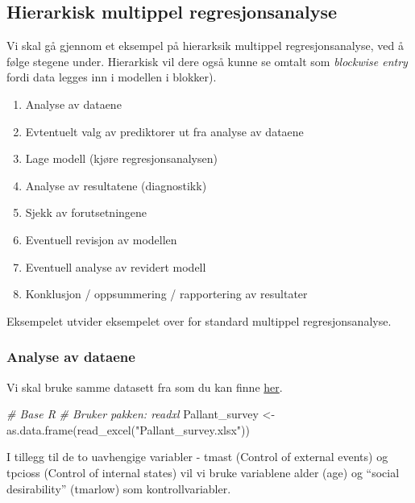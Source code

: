 \documentclass[
]{article}
\newenvironment{Shaded}{\begin{snugshade}}{\end{snugshade}}
\newcommand{\CommentTok}[1]{\textcolor[rgb]{0.56,0.35,0.01}{\textit{#1}}}
\newcommand{\FunctionTok}[1]{\textcolor[rgb]{0.00,0.00,0.00}{#1}}
\newcommand{\NormalTok}[1]{#1}
\newcommand{\OtherTok}[1]{\textcolor[rgb]{0.56,0.35,0.01}{#1}}
\newcommand{\StringTok}[1]{\textcolor[rgb]{0.31,0.60,0.02}{#1}}
\begin{document}
\hypertarget{hierarkisk-multippel-regresjonsanalyse}{%
\subsection{Hierarkisk multippel regresjonsanalyse}\label{hierarkisk-multippel-regresjonsanalyse}}

Vi skal gå gjennom et eksempel på hierarksik multippel regresjonsanalyse, ved å følge stegene under. Hierarkisk vil dere også kunne se omtalt som \emph{blockwise entry} fordi data legges inn i modellen i blokker).

\begin{enumerate}
\def\labelenumi{\arabic{enumi}.}
\item
  Analyse av dataene
\item
  Evtentuelt valg av prediktorer ut fra analyse av dataene
\item
  Lage modell (kjøre regresjonsanalysen)
\item
  Analyse av resultatene (diagnostikk)
\item
  Sjekk av forutsetningene
\item
  Eventuell revisjon av modellen
\item
  Eventuell analyse av revidert modell
\item
  Konklusjon / oppsummering / rapportering av resultater
\end{enumerate}

Eksempelet utvider eksempelet over for standard multippel regresjonsanalyse.

\hypertarget{analyse-av-dataene-1}{%
\subsubsection{Analyse av dataene}\label{analyse-av-dataene-1}}

Vi skal bruke samme datasett fra \citet{pallantSPSSSurvivalManual2010} som du kan finne \href{https://www.mheducation.co.uk/data-files}{her}.

\begin{Shaded}
\begin{Highlighting}[]
\CommentTok{\# Base R}
\CommentTok{\# Bruker pakken: readxl}
\NormalTok{Pallant\_survey }\OtherTok{\textless{}{-}} \FunctionTok{as.data.frame}\NormalTok{(}\FunctionTok{read\_excel}\NormalTok{(}\StringTok{"Pallant\_survey.xlsx"}\NormalTok{))}
\end{Highlighting}
\end{Shaded}

I tillegg til de to uavhengige variabler - tmast (Control of external events) og tpcioss (Control of internal states) vil vi bruke variablene alder (age) og ``social desirability'' (tmarlow) som kontrollvariabler.
\end{document}
